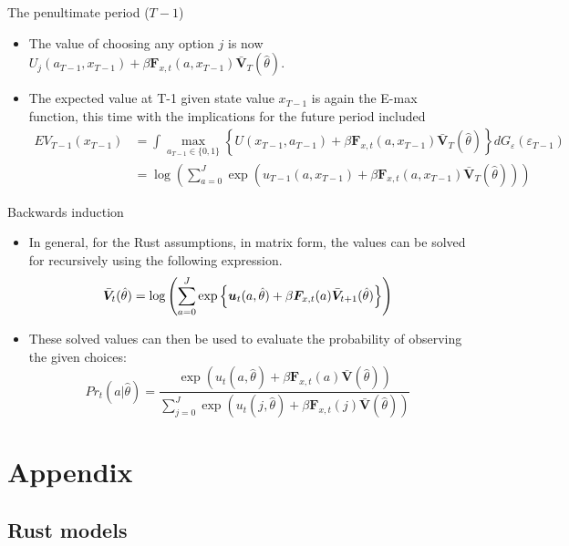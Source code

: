 \documentclass[aspectratio=169]{beamer}
\begin{document}
	\begin{frame}{The penultimate period ($T-1$)}
		\begin{itemize}
			\itemsep1em
			\item The value of choosing any option $j$ is now $U_j(a_{T-1},x_{T-1}) + \beta \bm{F}_{x,t}(a,x_{T-1}) \bar{\bm{V}}_{T}(\hat{\theta})$.
			\item The expected value at T-1 given state value $x_{T-1}$ is again the E-max function, this time with the implications for the future period included
			\begin{align}
				EV_{T-1}(x_{T-1}) &= \int \max_{a_{T-1} \in \{0,1\}} \left\{ U(x_{T-1},a_{T-1}) + \beta \bm{F}_{x,t}(a,x_{T-1}) \bar{\bm{V}}_{T}(\hat{\theta}) \right\} dG_\varepsilon(\varepsilon_{T-1}) \\
				&= \log \left(\sum_{a=0}^J \exp(u_{T-1}(a,x_{T-1}) + \beta \bm{F}_{x,t}(a,x_{T-1}) \bar{\bm{V}}_{T}(\hat{\theta}))\right)
			\end{align}
		\end{itemize}
	\end{frame}
	
	\begin{frame}{Backwards induction}
		\begin{itemize}
			\itemsep1em
			\item In general, for the Rust assumptions, in matrix form, the values can be solved for recursively using the following expression.
			\begin{equation}
				\Bar{\bm{V}}_t(\hat{\theta}) = \log \left( \sum_{a=0}^J \exp \left\{ \bm{u}_t(a,\hat{\theta}) + \beta \bm{F}_{x,t}(a) \bar{\bm{V}}_{t+1}(\hat{\theta}) \right\} \right)
			\end{equation}
			\item These solved values can then be used to evaluate the probability of observing the given choices:
			\begin{equation}
				Pr_t(a | \hat{\theta}) = \frac{\exp(u_t(a,\hat{\theta}) + \beta \bm{F}_{x,t}(a) \bar{\bm{V}}(\hat{\theta}))}{\sum_{j =0}^J \exp(u_t(j,\hat{\theta}) + \beta \bm{F}_{x,t}(j) \bar{\bm{V}}(\hat{\theta}))}
			\end{equation}
		\end{itemize}
	\end{frame}
	
	\appendix
	\section{Appendix}
	\subsection{Rust models}\label{subsec:rust_assumptions}
	
\end{document}
